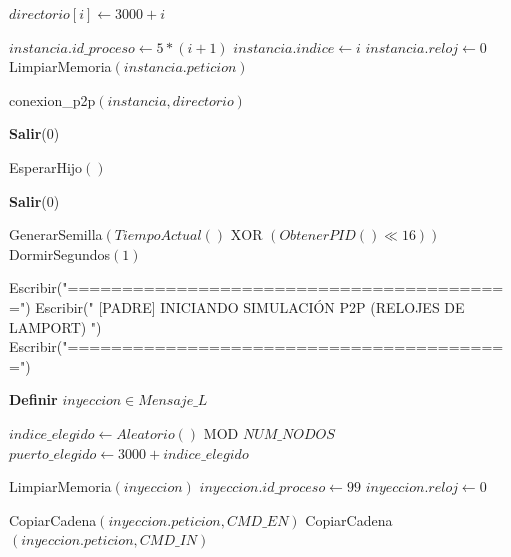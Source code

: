 \begin{tcolorbox}[colback=white, colframe=azul_unam, title=Pseudocódigo: sinc\_lamport.c (P2P), breakable]
\begin{algorithmic}[1]
 

        \State $directorio[i] \gets 3000 + i$
    \EndFor

        
         
            
            \State $instancia.id\_proceso \gets 5 * (i + 1)$
            \State $instancia.indice \gets i$
            \State $instancia.reloj \gets 0$
            \State LimpiarMemoria$(instancia.peticion)$
            
            \State conexion\_p2p$(instancia, directorio)$
            
            \State \textbf{Salir}(0)
            
        \EndIf
        
    \EndFor

        \State EsperarHijo$()$
    \EndFor

    \State \textbf{Salir}(0)

\Else {}

    \State GenerarSemilla$(TiempoActual() \text{ XOR } (ObtenerPID() \ll 16))$
    \State DormirSegundos$(1)$
    
    \State Escribir("=========================================")
    \State Escribir(" [PADRE] INICIANDO SIMULACIÓN P2P (RELOJES DE LAMPORT) ")
    \State Escribir("=========================================")
    
    \State \textbf{Definir} $inyeccion \in Mensaje\_L$
    
        
        \State $indice\_elegido \gets Aleatorio() \text{ MOD } NUM\_NODOS$
        \State $puerto\_elegido \gets 3000 + indice\_elegido$
        
        \State LimpiarMemoria$(inyeccion)$
        \State $inyeccion.id\_proceso \gets 99$
        \State $inyeccion.reloj \gets 0$ 
        
            \State CopiarCadena$(inyeccion.peticion, CMD\_EN)$
        \Else
            \State CopiarCadena$(inyeccion.peticion, CMD\_IN)$
        \EndIf
        

\end{algorithmic}
\end{tcolorbox}
